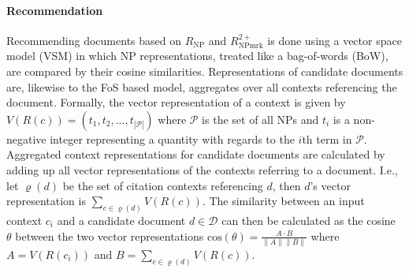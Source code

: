 \paragraph{Recommendation} Recommending documents based on ${R_{\text{NP}}}$ and ${R_{\text{NPmrk}}^{2+}}$ is done using a vector space model (VSM) in which NP representations, treated like a bag-of-words (BoW), are compared by their cosine similarities. Representations of candidate documents are, likewise to the FoS based model, aggregates over all contexts referencing the document. Formally, the vector representation of a context is given by $V(R(c)) = (t_{1}, t_{2}, ..., t_{|\mathcal{P}|})$ where $\mathcal{P}$ is the set of all NPs %
and $t_{i}$ is a non-negative integer representing a quantity with regards to the $i$th term in $\mathcal{P}$. Aggregated context representations for candidate documents are calculated by adding up all vector representations of the contexts referring to a document. I.e., let $\varrho(d)$ be the set of citation contexts referencing $d$, then $d$'s vector representation is $\sum\limits_{c \in \varrho(d)} V(R(c))$. The similarity between an input context $c_i$ and a candidate document $d\in \mathcal{D}$ can then be calculated as the cosine $\theta$ between the two vector representations ${\mathrm{cos}(\theta)=\frac{A\cdot B}{\|A\| \|B\|}}$ where  $A=V(R(c_i))$ and $B=\sum\limits_{c \in \varrho(d)} V(R(c))$.

